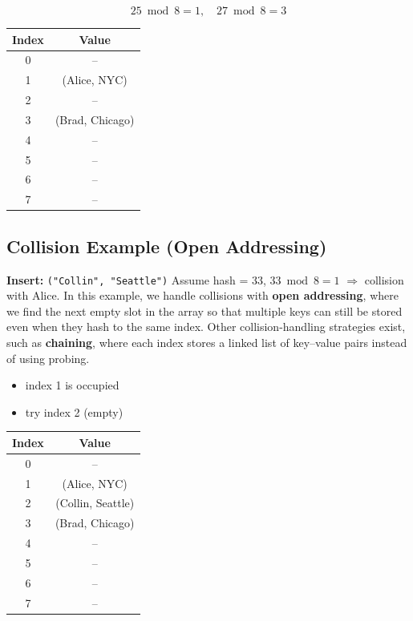 \[
25 \bmod 8 = 1,\quad 27 \bmod 8 = 3
\]

\begin{center}
\begin{tabular}{c c}
\toprule
Index & Value \\
\midrule
0 & -- \\
1 & (Alice, NYC) \\
2 & -- \\
3 & (Brad, Chicago) \\
4 & -- \\
5 & -- \\
6 & -- \\
7 & -- \\
\bottomrule
\end{tabular}
\end{center}

\subsection{Collision Example (Open Addressing)}
\textbf{Insert:} \texttt{("Collin", "Seattle")}  
Assume hash = 33, $33 \bmod 8 = 1$ $\Rightarrow$ collision with Alice. In this example, we handle collisions with \textbf{open addressing}, where we find the next empty slot in the array so that multiple keys can still be stored even when they hash to the same index. Other collision-handling strategies exist, such as \textbf{chaining}, where each index stores a linked list of key–value pairs instead of using probing.


\begin{itemize}
  \item index 1 is occupied
  \item try index 2 (empty)
\end{itemize}

\begin{center}
\begin{tabular}{c c}
\toprule
Index & Value \\
\midrule
0 & -- \\
1 & (Alice, NYC) \\
2 & (Collin, Seattle) \\
3 & (Brad, Chicago) \\
4 & -- \\
5 & -- \\
6 & -- \\
7 & -- \\
\bottomrule
\end{tabular}
\end{center}

